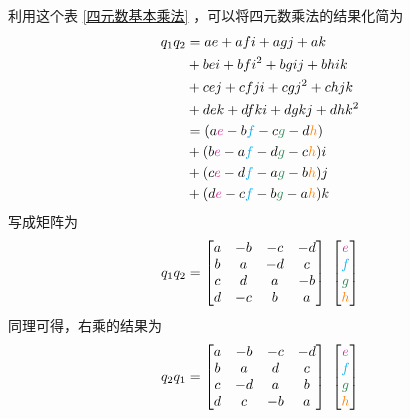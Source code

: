 \summarize[
\hspace{1em} 记忆方法：类似于向量的叉乘，将$i,j,k$理解为三维右手坐标系，则$i \times j =k , j \times i = -k$，其余类似。
]

利用这个表 \ref{四元数基本乘法} ，可以将四元数乘法的结果化简为
\begin{align}
	q_1 q_2 & = ae + afi + agj + ak \notag \\
& + bei + bfi^2 + bgij + bhik \notag \\
& + cej + cfji + cgj^2 + chjk \notag \\
& + dek + dfki + dgkj + dhk^2 \notag \\
& = (a {\color{VioletRed} e} - b {\color{cyan} f} - c{\color{SeaGreen} g} - d{\color{orange} h}) \notag \\
& + (b {\color{VioletRed} e} - a {\color{cyan} f} - d{\color{SeaGreen} g} - c{\color{orange} h}) i \notag \\
& + (c {\color{VioletRed} e} - d {\color{cyan} f} - a{\color{SeaGreen} g} - b{\color{orange} h}) j \notag \\
& + (d {\color{VioletRed} e} - c {\color{cyan} f} - b{\color{SeaGreen} g} - a{\color{orange} h}) k
\end{align}
写成矩阵为
\begin{equation}
		q_1 q_2 = 
		\begin{bmatrix}
			a & -b & -c & -d \\
			b & a & -d & c \\
			c & d & a & -b \\
			d & -c & b & a
		\end{bmatrix}
		\,\, 
		\begin{bmatrix}
		 {\color{VioletRed} e} \\
		 {\color{cyan} f} \\
		 {\color{SeaGreen} g} \\
		 {\color{orange} h} 
		\end{bmatrix}
\end{equation}
同理可得，右乘的结果为
\begin{equation}
	q_2 q_1 = 
	\begin{bmatrix}
		a & -b & -c & -d \\
		b & a & d & c \\
		c & -d & a & b \\
		d & c & -b & a
	\end{bmatrix}
	\,\, 
	\begin{bmatrix}
		{\color{VioletRed} e} \\
		{\color{cyan} f} \\
		{\color{SeaGreen} g} \\
		{\color{orange} h} 
	\end{bmatrix}
\end{equation}
\vspace*{0.5em}


